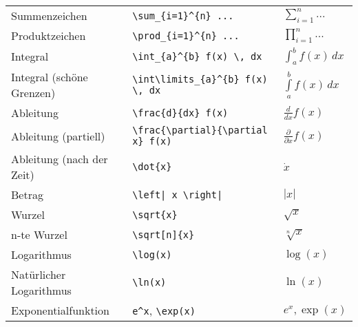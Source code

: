 \begin{longtable}{l l l}
    \midrule
    Summenzeichen             & \texttt{\textbackslash sum\_\{i=1\}\^{}\{n\} ...}                                        & $ \sum_{i=1}^{n} ... $               \\
    Produktzeichen            & \texttt{\textbackslash prod\_\{i=1\}\^{}\{n\} ...}                                       & $ \prod_{i=1}^{n} ... $              \\
    Integral                  & \texttt{\textbackslash int\_\{a\}\^{}\{b\} f(x) \textbackslash, dx}                      & $ \int_{a}^{b} f(x) \,dx $           \\
    Integral (schöne Grenzen) & \texttt{\textbackslash int\textbackslash limits\_\{a\}\^{}\{b\} f(x) \textbackslash, dx} & $ \int\limits_{a}^{b} f(x) \,dx $    \\
    Ableitung                 & \texttt{\textbackslash frac\{d\}\{dx\} f(x)}                                             & $ \frac{d}{dx} f(x) $                \\
    Ableitung (partiell)      & \texttt{\textbackslash frac\{\textbackslash partial\}\{\textbackslash partial x\} f(x)}  & $ \frac{\partial}{\partial x} f(x) $ \\
    Ableitung (nach der Zeit) & \texttt{\textbackslash dot\{x\}}                                                         & $ \dot{x} $                          \\

    \midrule
    Betrag                    & \texttt{\textbackslash left| x \textbackslash right|}                                    & $ \left| x \right| $                 \\
    Wurzel                    & \texttt{\textbackslash sqrt\{x\}}                                                        & $ \sqrt{x} $                         \\
    n-te Wurzel               & \texttt{\textbackslash sqrt[n]\{x\}}                                                     & $ \sqrt[n]{x} $                      \\
    Logarithmus               & \texttt{\textbackslash log{(x)}}                                                         & $ \log{(x)} $                        \\
    Natürlicher Logarithmus   & \texttt{\textbackslash ln{(x)}}                                                          & $ \ln{(x)} $                         \\
    Exponentialfunktion       & \texttt{e\^{}x}, \texttt{\textbackslash exp{(x)}}                                        & $ e^x, \exp{(x)} $                   \\


\end{longtable}
